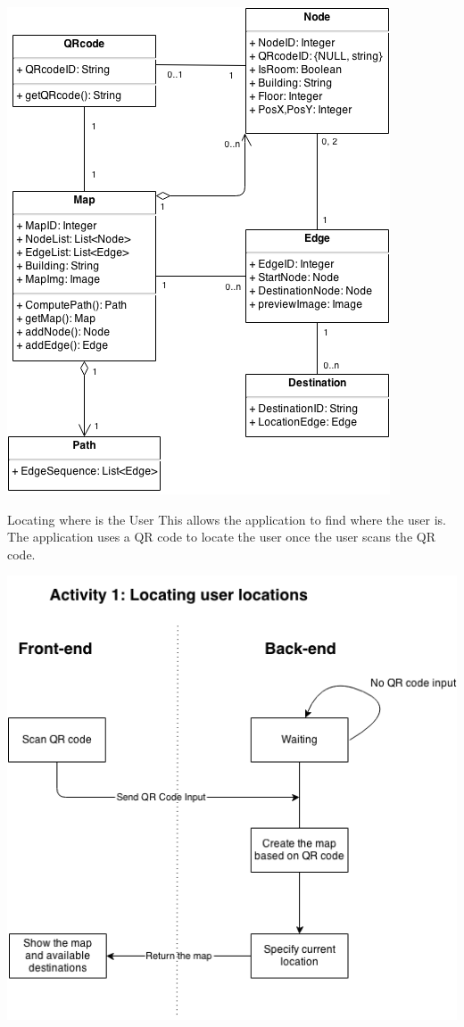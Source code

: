 \documentclass[12pt]{article}
\begin{document}
\begin{center}
\includegraphics[scale=0.6]{image/image01.png}
\end{center}

Locating where is the User
This allows the application to find where the user is. The application uses a QR code to locate the user once the user scans the QR code.

\begin{center}
\includegraphics[scale=0.6]{image/image00.png}
\end{center}
\end{document}
